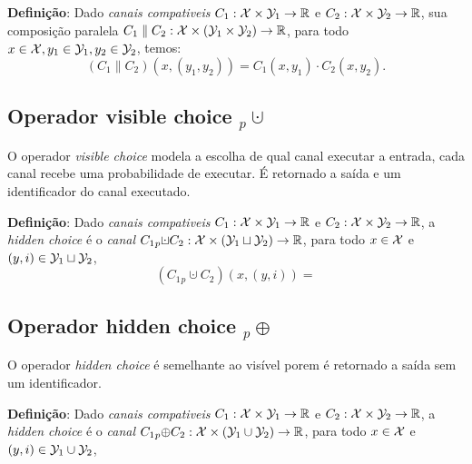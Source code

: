 \textbf{Definição}: Dado \emph{canais compativeis} $C_1:\mathcal{X}\times\mathcal{Y}_1 \rightarrow \mathbb{R}$ e $C_2:\mathcal{X}\times\mathcal{Y}_2 \rightarrow \mathbb{R}$, sua composição paralela $C_1 \parallel C_2 : \mathcal{X}\times(\mathcal{Y}_1\times\mathcal{Y}_2) \rightarrow \mathbb{R}$, para todo $x\in\mathcal{X}, y_1\in\mathcal{Y}_1, y_2\in\mathcal{Y}_2$, temos: $$(C_1 \parallel C_2)(x,(y_1,y_2)) = C_1(x,y_1) \cdot C_2(x,y_2).$$
\subsection*{Operador visible choice ${}_p{\cupdot}$}  
O operador \emph{visible choice} modela a escolha de qual canal executar a entrada, cada canal recebe uma probabilidade de executar. É retornado a saída e um identificador do canal executado.

\textbf{Definição}: Dado \emph{canais compativeis} $C_1:\mathcal{X}\times\mathcal{Y}_1 \rightarrow \mathbb{R}$ e $C_2:\mathcal{X}\times\mathcal{Y}_2 \rightarrow \mathbb{R}$, a \emph{hidden choice} é o \emph{canal} $C_1 {}_p{\cupdot} C_2: \calx\times (\caly_1 \sqcup \caly_2)\rightarrow\reals$, para todo $x\in\mathcal{X}$ e $(y,i)\in\mathcal{Y}_1\sqcup\mathcal{Y}_2$,
$$ (C_1 {}_p{\cupdot} C_2)(x,(y,i)) =  $$ 

\subsection*{Operador hidden choice ${}_p{\oplus}$}  
O operador \emph{hidden choice} é semelhante ao visível porem é retornado a saída sem um identificador.

\textbf{Definição}: Dado \emph{canais compativeis} $C_1:\mathcal{X}\times\mathcal{Y}_1 \rightarrow \mathbb{R}$ e $C_2:\mathcal{X}\times\mathcal{Y}_2 \rightarrow \mathbb{R}$, a \emph{hidden choice} é o \emph{canal} $C_1 {}_p{\oplus} C_2: \mathcal{X}\times (\mathcal{Y}_1 \cup \mathcal{Y}_2)\rightarrow\mathbb{R}$, para todo $x\in\mathcal{X}$ e $(y,i)\in\mathcal{Y}_1\cup\mathcal{Y}_2$,
